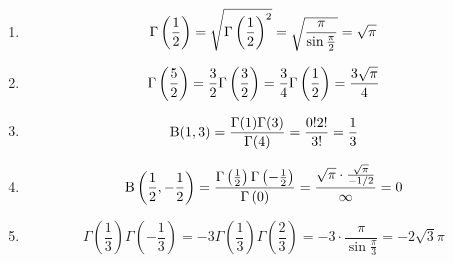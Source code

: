 \item

\begin{enumerate}[wide, labelindent = 0pt, label = (\alph*)]
\item
\[
    \Gamma\left( \frac{1}{2} \right)
    = \sqrt{{\Gamma\left( \frac{1}{2} \right)}^2}
    = \sqrt{\frac{\pi}{\sin \frac{\pi}{2}}}
    = \sqrt{\pi}
\]

\item
\[
    \Gamma\left( \frac{5}{2} \right)
    = \frac{3}{2} \Gamma\left( \frac{3}{2} \right)
    = \frac{3}{4} \Gamma\left( \frac{1}{2} \right)
    = \frac{3\sqrt{\pi}}{4}
\]

\item
\[
    \operatorname{B}(1, 3)
    = \frac{\Gamma(1) \Gamma(3)}{\Gamma(4)}
    = \frac{0! 2!}{3!}
    = \frac{1}{3}
\]

\item
\[
    \operatorname{B} \left( \frac{1}{2}, -\frac{1}{2} \right)
    = \frac{\Gamma\left( \frac{1}{2} \right) \Gamma\left( -\frac{1}{2} \right)}{\Gamma\left( 0 \right)}
    = \frac{\sqrt{\pi} \cdot \frac{\sqrt{\pi}}{-1/2}}{\infty}
    = 0
\]

\item
\[
    \Gamma\left( \frac{1}{3} \right) \Gamma\left( -\frac{1}{3} \right)
    = -3 \Gamma\left( \frac{1}{3} \right) \Gamma\left( \frac{2}{3} \right)
    = -3 \cdot \frac{\pi}{\sin \frac{\pi}{3}}
    = -2\sqrt{3}\pi
\]

\end{enumerate}
